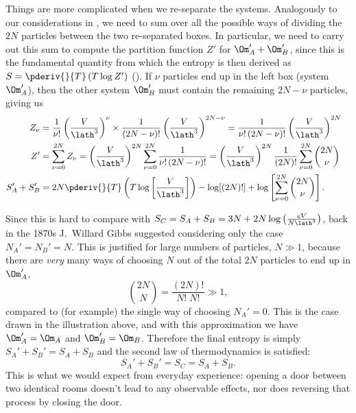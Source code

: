 Things are more complicated when we re-separate the systems.
Analogously to our considerations in , we need to sum over all the possible ways of dividing the $2N$ particles between the two re-separated boxes.
In particular, we need to carry out this sum to compute the partition function $Z'$ for $\Om_A' + \Om_B'$, since this is the fundamental quantity from which the entropy is then derived as $S = \pderiv{}{T}\left(T\log Z'\right)$ ().
If $\nu$ particles end up in the left box (system $\Om_A'$), then the other system $\Om_B'$ must contain the remaining $2N - \nu$ particles, giving us
\begin{align}
  Z_{\nu}     & = \frac{1}{\nu!} \left(\frac{V}{\lath^3}\right)^{\nu} \times \frac{1}{(2N - \nu)!} \left(\frac{V}{\lath^3}\right)^{2N - \nu} = \frac{1}{\nu! \, (2N - \nu)!} \left(\frac{V}{\lath^3}\right)^{2N} \cr
  Z'          & = \sum_{\nu = 0}^{2N} Z_{\nu} = \left(\frac{V}{\lath^3}\right)^{2N} \sum_{\nu = 0}^{2N} \frac{1}{\nu! \, (2N - \nu)!} = \left(\frac{V}{\lath^3}\right)^{2N} \frac{1}{(2N)!} \sum_{\nu = 0}^{2N} \binom{2N}{\nu} \cr
  S_A' + S_B' & = 2N \pderiv{}{T}\left(T\log \left[\frac{V}{\lath^3}\right]\right) - \log[(2N)!] + \log\left[\sum_{\nu = 0}^{2N} \binom{2N}{\nu}\right]. \label{eq:mixing_full}
\end{align}

Since this is hard to compare with $S_C = S_A + S_B = 3N + 2N \log\left(\frac{eV}{N\lath^3}\right)$, back in the 1870s J.\ Willard Gibbs suggested considering only the case $N_A' = N_B' = N$.
This is justified for large numbers of particles, $N \gg 1$, because there are \textit{very} many ways of choosing $N$ out of the total $2N$ particles to end up in $\Om_A'$,
\begin{equation}
  \label{eq:mixing_factorial}
  \binom{2N}{N} = \frac{(2N)!}{N! \; N!} \gg 1,
\end{equation}
compared to (for example) the single way of choosing $N_A' = 0$.
This is the case drawn in the illustration above, and with this approximation we have $\Om_A' = \Om_A$ and $\Om_B' = \Om_B$.
Therefore the final entropy is simply $S_A' + S_B' = S_A + S_B$ and the second law of thermodynamics is satisfied:
\begin{equation*}
  S_A' + S_B' = S_C = S_A + S_B.
\end{equation*}
This is what we would expect from everyday experience: opening a door between two identical rooms doesn't lead to any observable effects, nor does reversing that process by closing the door.

